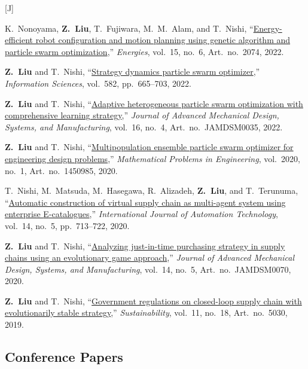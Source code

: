 \documentclass[11pt,a4paper]{article}
\newcommand{\doititle}[2]{\href{https://doi.org/#1}{#2}}
\newlength{\datecol}
\newcounter{pubno}
\newenvironment{publist}[1]{%
  \begin{list}{[#1\arabic{pubno}]}{%
    \usecounter{pubno}%
    \setlength{\leftmargin}{\datecol}%
    \setlength{\labelwidth}{\datecol}%
    \setlength{\labelsep}{0pt}%
    \setlength{\itemsep}{3pt}%
    \setlength{\parsep}{0pt}%
    \setlength{\topsep}{2pt}%
    \renewcommand{\makelabel}[1]{##1\hfil}}}%
  {\end{list}}
\begin{document}
\begin{publist}{J}
\item K.~Nonoyama, \textbf{Z.~Liu}, T.~Fujiwara, M.~M.~Alam, and T.~Nishi, ``\doititle{10.3390/en15062074}{Energy-efficient robot configuration and motion planning using genetic algorithm and particle swarm optimization},'' \textit{Energies}, vol.~15, no.~6, Art.~no.~2074, 2022.
\item \textbf{Z.~Liu} and T.~Nishi, ``\doititle{10.1016/j.ins.2021.10.028}{Strategy dynamics particle swarm optimizer},'' \textit{Information Sciences}, vol.~582, pp.~665--703, 2022.
\item \textbf{Z.~Liu} and T.~Nishi, ``\doititle{10.1299/jamdsm.2022jamdsm0035}{Adaptive heterogeneous particle swarm optimization with comprehensive learning strategy},'' \textit{Journal of Advanced Mechanical Design, Systems, and Manufacturing}, vol.~16, no.~4, Art.~no.~JAMDSM0035, 2022.
\item \textbf{Z.~Liu} and T.~Nishi, ``\doititle{10.1155/2020/1450985}{Multipopulation ensemble particle swarm optimizer for engineering design problems},'' \textit{Mathematical Problems in Engineering}, vol.~2020, no.~1, Art.~no.~1450985, 2020.
\item T.~Nishi, M.~Matsuda, M.~Hasegawa, R.~Alizadeh, \textbf{Z.~Liu}, and T.~Terunuma, ``\doititle{10.20965/ijat.2020.p0713}{Automatic construction of virtual supply chain as multi-agent system using enterprise {E}-catalogues},'' \textit{International Journal of Automation Technology}, vol.~14, no.~5, pp.~713--722, 2020.
\item \textbf{Z.~Liu} and T.~Nishi, ``\doititle{10.1299/jamdsm.2020jamdsm0070}{Analyzing just-in-time purchasing strategy in supply chains using an evolutionary game approach},'' \textit{Journal of Advanced Mechanical Design, Systems, and Manufacturing}, vol.~14, no.~5, Art.~no.~JAMDSM0070, 2020.
\item \textbf{Z.~Liu} and T.~Nishi, ``\doititle{10.3390/su11185030}{Government regulations on closed-loop supply chain with evolutionarily stable strategy},'' \textit{Sustainability}, vol.~11, no.~18, Art.~no.~5030, 2019.
\end{publist}

\subsection*{Conference Papers}
\end{document}
